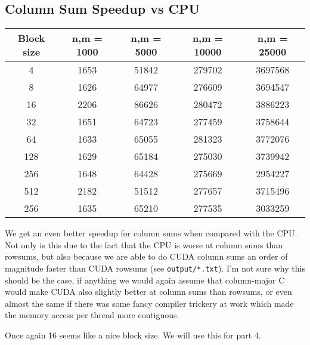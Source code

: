 \documentclass[a4paper, fleqn]{article}
\begin{document}
\subsection{Column Sum Speedup vs CPU}%
\begin{center}
 \begin{tabular}{||c | c | c | c | c ||}
 \hline
 Block size & n,m = 1000 & n,m = 5000 & n,m = 10000 & n,m = 25000 \\ [0.5ex] 
 \hline
 4 & 1653 & 51842 & 279702 & 3697568 \\
 \hline
 8 & 1626 & 64977 & 276609 & 3694547 \\
 \hline
 16 & 2206 & 86626 & 280472 & 3886223 \\
 \hline
 32 & 1651 & 64723 & 277459 & 3758644 \\
 \hline
 64 & 1633 & 65055 & 281323 & 3772076 \\
 \hline
 128 & 1629 & 65184 & 275030 & 3739942 \\
 \hline
 256 & 1648 & 64428 & 275669 & 2954227 \\
 \hline
 512 & 2182 & 51512 & 277657 & 3715496 \\
 \hline
 256 & 1635 & 65210 & 277535 & 3033259 \\
 \hline
 \hline
\end{tabular}
\end{center}
We get an even better speedup for column sums when compared with the CPU. Not only is this due to the fact that the CPU is worse at column sums than rowsums, but also because we are able to do CUDA column sums an order of magnitude faster than CUDA rowsums (see \texttt{output/*.txt}). I'm not sure why this should be the case, if anything we would again assume that column-major C would make CUDA also slightly better at column sums than rowsums, or even almost the same if there was some fancy compiler trickery at work which made the memory access per thread more contiguous. 

        Once again 16 seems like a nice block size. We will use this for part 4.
\end{document}
